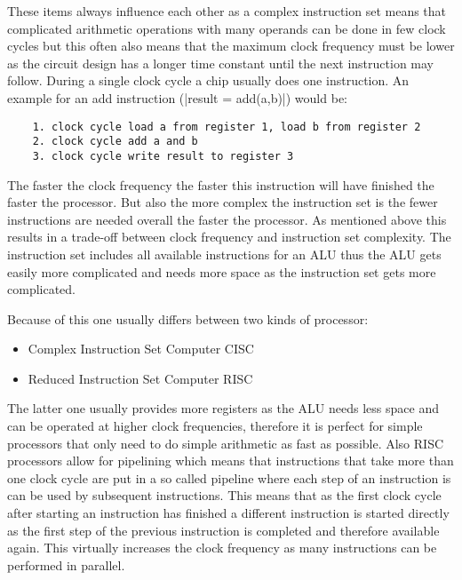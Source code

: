 These items always influence each other as a complex instruction set means that complicated arithmetic operations with many operands can be done in few clock cycles but this often also means that the maximum clock frequency must be lower as the circuit design has a longer time constant until the next instruction may follow.
During a single clock cycle a chip usually does one instruction.
An example for an add instruction (|result = add(a,b)|) would be:
\begin{lstlisting}
    1. clock cycle load a from register 1, load b from register 2
    2. clock cycle add a and b
    3. clock cycle write result to register 3
\end{lstlisting}
The faster the clock frequency the faster this instruction will have finished the faster the processor.
But also the more complex the instruction set is the fewer instructions are needed overall the faster the processor.
As mentioned above this results in a trade-off between clock frequency and instruction set complexity.
The instruction set includes all available instructions for an ALU thus the ALU gets easily more complicated and needs more space as the instruction set gets more complicated.

Because of this one usually differs between two kinds of processor:
\begin{itemize}
    \item Complex Instruction Set Computer CISC
    \item Reduced Instruction Set Computer RISC
\end{itemize}
The latter one usually provides more registers as the ALU needs less space and can be operated at higher clock frequencies, therefore it is perfect for simple processors that only need to do simple arithmetic as fast as possible.
Also RISC processors allow for pipelining which means that instructions that take more than one clock cycle are put in a so called pipeline where each step of an instruction is can be used by subsequent instructions.
This means that as the first clock cycle after starting an instruction has finished a different instruction is started directly as the first step of the previous instruction is completed and therefore available again.
This virtually increases the clock frequency as many instructions can be performed in parallel.

